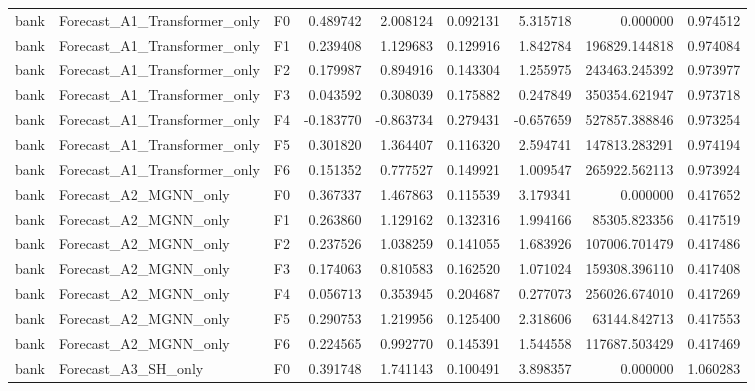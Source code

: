\begin{tabular}{lllrrrrrr}
      bank & Forecast\_A1\_Transformer\_only &  F0 &  0.489742 &  2.008124 & 0.092131 &  5.315718 &         0.000000 &             0.974512 \\
      bank & Forecast\_A1\_Transformer\_only &  F1 &  0.239408 &  1.129683 & 0.129916 &  1.842784 &    196829.144818 &             0.974084 \\
      bank & Forecast\_A1\_Transformer\_only &  F2 &  0.179987 &  0.894916 & 0.143304 &  1.255975 &    243463.245392 &             0.973977 \\
      bank & Forecast\_A1\_Transformer\_only &  F3 &  0.043592 &  0.308039 & 0.175882 &  0.247849 &    350354.621947 &             0.973718 \\
      bank & Forecast\_A1\_Transformer\_only &  F4 & -0.183770 & -0.863734 & 0.279431 & -0.657659 &    527857.388846 &             0.973254 \\
      bank & Forecast\_A1\_Transformer\_only &  F5 &  0.301820 &  1.364407 & 0.116320 &  2.594741 &    147813.283291 &             0.974194 \\
      bank & Forecast\_A1\_Transformer\_only &  F6 &  0.151352 &  0.777527 & 0.149921 &  1.009547 &    265922.562113 &             0.973924 \\
      bank &        Forecast\_A2\_MGNN\_only &  F0 &  0.367337 &  1.467863 & 0.115539 &  3.179341 &         0.000000 &             0.417652 \\
      bank &        Forecast\_A2\_MGNN\_only &  F1 &  0.263860 &  1.129162 & 0.132316 &  1.994166 &     85305.823356 &             0.417519 \\
      bank &        Forecast\_A2\_MGNN\_only &  F2 &  0.237526 &  1.038259 & 0.141055 &  1.683926 &    107006.701479 &             0.417486 \\
      bank &        Forecast\_A2\_MGNN\_only &  F3 &  0.174063 &  0.810583 & 0.162520 &  1.071024 &    159308.396110 &             0.417408 \\
      bank &        Forecast\_A2\_MGNN\_only &  F4 &  0.056713 &  0.353945 & 0.204687 &  0.277073 &    256026.674010 &             0.417269 \\
      bank &        Forecast\_A2\_MGNN\_only &  F5 &  0.290753 &  1.219956 & 0.125400 &  2.318606 &     63144.842713 &             0.417553 \\
      bank &        Forecast\_A2\_MGNN\_only &  F6 &  0.224565 &  0.992770 & 0.145391 &  1.544558 &    117687.503429 &             0.417469 \\
      bank &          Forecast\_A3\_SH\_only &  F0 &  0.391748 &  1.741143 & 0.100491 &  3.898357 &         0.000000 &             1.060283 \\

\end{tabular}
